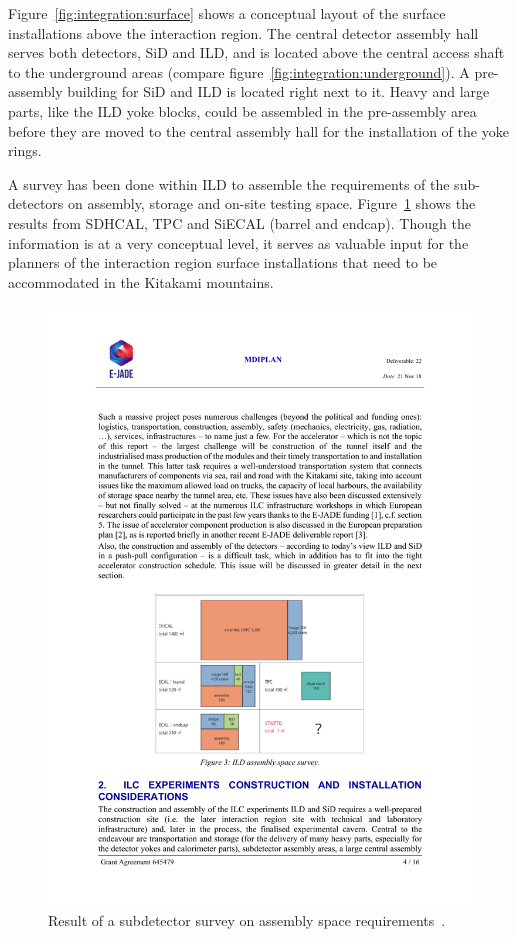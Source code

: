Figure~\ref{fig:integration:surface} shows a conceptual layout of the surface installations above the interaction region. The central detector assembly hall serves both detectors, SiD and ILD, and is located above the central access shaft to the underground areas (compare figure~\ref{fig:integration:underground}). A pre-assembly building for SiD and ILD is located right next to it. Heavy and large parts, like the ILD yoke blocks, could be assembled in the pre-assembly area before they are moved to the central assembly hall for the installation of the yoke rings.

A survey has been done within ILD to assemble the requirements of the sub-detectors on assembly, storage and on-site testing space. Figure~\ref{fig:integration:assembly_space} shows the results from SDHCAL, TPC and SiECAL (barrel and endcap). Though the information is at a very conceptual level, it serves as valuable input for the planners of the interaction region surface installations that need to be accommodated in the Kitakami mountains.
\begin{figure}[h!]
\centering
\includegraphics[width=0.8\hsize]{Integration/fig/assembly_space_survey.pdf}
\caption{\label{fig:integration:assembly_space}Result of a subdetector survey on assembly space requirements~\cite{ild:bib:ejade_mdi}.}
\end{figure}

